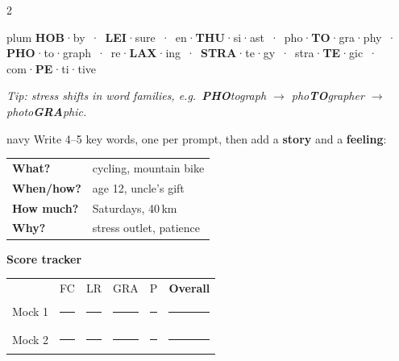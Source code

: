 \documentclass[10pt,a4paper]{article}
\begin{document}
\begin{multicols}{2}
\raggedcolumns
\begin{tipbox}{plum}
\textbf{HOB}·by \,·\, \textbf{LEI}·sure \,·\, en·\textbf{THU}·si·ast \,·\, pho·\textbf{TO}·gra·phy
\,·\, \textbf{PHO}·to·graph \,·\, re·\textbf{LAX}·ing \,·\, \textbf{STRA}·te·gy \,·\,
stra·\textbf{TE}·gic \,·\, com·\textbf{PE}·ti·tive\par\smallskip
\textit{Tip: stress shifts in word families, e.g.\ \textbf{PHO}tograph $\rightarrow$
pho\textbf{TO}grapher $\rightarrow$ photo\textbf{GRA}phic.}
\end{tipbox}
\columnbreak
\begin{tipbox}{navy}
Write 4--5 key words, one per prompt, then add a \textbf{story} and a \textbf{feeling}:\par\smallskip
\begin{tabular}{@{}ll@{}}
\textbf{What?} & cycling, mountain bike\\
\textbf{When/how?} & age 12, uncle's gift\\
\textbf{How much?} & Saturdays, 40\,km\\
\textbf{Why?} & stress outlet, patience\\
\end{tabular}
\end{tipbox}
\end{multicols}

\vfill
\begin{tcolorbox}[enhanced,colback=sand,colframe=gold,boxrule=0.5pt,arc=2mm,
    left=3mm,right=3mm,top=1.5mm,bottom=1.5mm,fontupper=\footnotesize]
\textbf{\sffamily\color{navy}\faRoute\; Score tracker}\hfill
\begin{tabular}{l*{5}{c}}
 & \sffamily FC & \sffamily LR & \sffamily GRA & \sffamily P & \sffamily \textbf{Overall}\\
\sffamily Mock 1 & \rule{9mm}{0.4pt} & \rule{9mm}{0.4pt} & \rule{9mm}{0.4pt} & \rule{9mm}{0.4pt} & \rule{11mm}{0.4pt}\\[2pt]
\sffamily Mock 2 & \rule{9mm}{0.4pt} & \rule{9mm}{0.4pt} & \rule{9mm}{0.4pt} & \rule{9mm}{0.4pt} & \rule{11mm}{0.4pt}\\
\end{tabular}
\end{tcolorbox}
\end{document}
